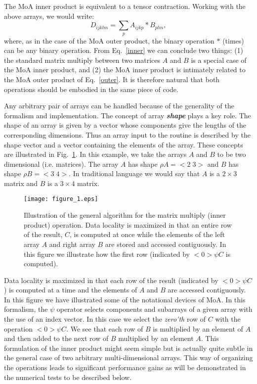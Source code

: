 \documentclass[aps,prl,twocolumn,groupedaddress,floatfix]{revtex4}
\begin{document}
The MoA inner product is equivalent to a tensor contraction.  Working with 
the above arrays, we would write: 
\begin{equation}
D_{ijklm} = \sum_p A_{ijkp} * B_{plm},
\label{inner}
\end{equation}
where, as in the case of the MoA outer product, the binary operation $*$
(times) can be any binary operation.  From Eq.~\ref{inner} we can 
conclude two things: (1) the standard matrix multiply between two 
matrices $A$ and $B$ is a special case of the MoA inner product, and 
(2) the MoA inner product is intimately related to the MoA outer product
of Eq.~\ref{outer}.  It is therefore natural that both operations should 
be embodied in the same piece of code.

Any arbitrary pair of arrays can be handled because of the generality of
the formalism and implementation.  The concept of array {\bf \em shape}
plays a key role.  The shape of an array is given by a vector whose
components give the lengths of the corresponding dimensions.  Thus an 
array input to the routine is described by the shape vector and a 
vector containing the elements of the array.  These concepts are illustrated
in Fig.~\ref{inner_fig}.  In this example, we take the arrays $A$ and $B$ to be
two dimensional (i.e. matrices).  The array $A$ has shape 
$\rho A = <\!2\;3\!>$ and $B$ has shape $\rho B = <\!3\;4\!>$.  In traditional
language we would say that $A$ is a $2\times 3$ matrix and $B$ is 
a $3\times 4$ matrix.

\begin{figure}
\texttt{[image: figure\_1.eps]}\caption{
\label{inner_fig}
Illustration of the general algorithm for the matrix multiply
(inner product) operation.  Data locality is maximized in that
an entire row of the result, $C$,  is computed at once while the elements
of the left array $A$ and right array $B$ are stored and accessed 
contiguously.  In this figure we illustrate how the first row (indicated
by $<0> \psi C$ is computed).
}
\end{figure}

Data locality is maximized in that each row of the result (indicated by
$<0> \psi C$) is computed at a time and the elements of $A$ and $B$
are accessed contiguously.  In this figure we have illustrated some of the
notational devices of MoA.  In this formalism, the $\psi$ operator selects
components and subarrays of a given array with the use of an index vector.
In this case we select the {\em zero'th} row of $C$ with the operation
$<0> \psi C$.  We see that each row of $B$ is multiplied by an element of 
$A$ and then added to the next row of $B$ multiplied by an element $A$.
This formulation of the inner product might seem simple but is actually 
quite subtle in the general case of two arbitrary multi-dimensional arrays.
This way of organizing the operations leads to significant performance
gains as will be demonstrated in the numerical tests to be described below.
\end{document}
